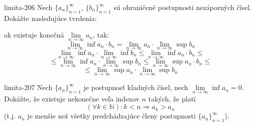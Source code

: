 \begin{defproblem}{limita-206}
Nech ${\{a_n\}}_{n=1}^\infty$, ${\{b_n\}}_{n=1}^\infty$ sú ohraničené
postupnosti nezáporných čísel. Dokážte nasledujúce tvrdenia:
\begin{tasks}
\task
    ak existuje konečná $\lim\limits_{n \rightarrow \infty} a_n$, tak:
    \[
        \lim\limits_{n \rightarrow \infty} \inf a_n \cdot b_n
        =\lim\limits_{n \rightarrow \infty} a_n \cdot \lim\limits_{n \rightarrow \infty} \sup b_n
    \]
\task
    \[
        \lim\limits_{n \rightarrow \infty} \inf a_n \cdot \lim\limits_{n \rightarrow
            \infty} \inf b_n
        \leq \lim\limits_{n \rightarrow \infty} \inf a_n \cdot b_n
        \leq
    \]
    \[
        \leq \lim\limits_{n \rightarrow \infty} \inf a_n \cdot \lim\limits_{n \rightarrow
            \infty} \sup b_n
        \leq \lim\limits_{n \rightarrow \infty} \sup a_n \cdot b_n
        \leq
    \]
    \[
        \leq \lim\limits_{n \rightarrow \infty} \sup a_n \cdot \lim\limits_{n \rightarrow
            \infty} \sup b_n
    \]
\end{tasks}
\end{defproblem}

\begin{defproblem}{limita-207}
Nech ${\{a_n\}}_{n=1}^\infty$ je postupnosť kladných čísel, nech
$\lim\limits_{n \rightarrow \infty} \inf a_n =0$. Dokážte, že existuje nekonečne
veľa indexov $n$ takých, že platí
\[
    (\forall k \in \mathbb{N}): k<n \Rightarrow a_k > a_n
\]
(t.j. $a_n$ je menšie než všetky predchádzajúce členy postupnosti
${\{a_n\}}_{n=1}^\infty$).
\end{defproblem}